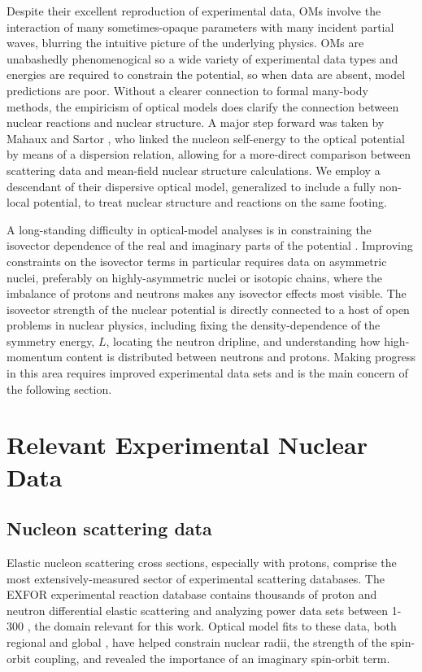 Despite their excellent reproduction of experimental data,
OMs involve the interaction of
many sometimes-opaque parameters with many incident
partial waves, blurring the intuitive picture of the underlying physics.
OMs are unabashedly phenomenogical so a wide variety of
experimental data types and energies are required to constrain the potential,
so when data are absent, model predictions are poor. Without a clearer connection to formal
many-body methods, the empiricism of optical models does clarify the connection between nuclear
reactions and nuclear structure. A major step forward was taken by Mahaux and Sartor
\cite{Mahaux1991}, who linked the nucleon self-energy to the \gls{optical potential} by means of a
dispersion relation, allowing for a more-direct comparison between scattering data and mean-field nuclear
structure calculations. We employ a descendant of their
dispersive optical model, generalized to include a
fully non-local potential, to treat nuclear structure and reactions on the same
footing.

A long-standing difficulty in optical-model analyses is in constraining the isovector dependence
of the real and imaginary parts of the potential \cite{Holt16, Anderson1990}. Improving constraints on the
isovector terms in particular requires data
on asymmetric nuclei, preferably on highly-asymmetric nuclei or isotopic chains,
where the imbalance of protons and neutrons makes any isovector effects most visible. The isovector
strength of the nuclear potential is directly connected to a host of open problems in nuclear physics,
including fixing the density-dependence of the symmetry energy, $L$, locating the
neutron dripline, and understanding how high-momentum content is distributed between neutrons and
protons. Making progress in this area requires improved experimental data sets
and is the main concern of the following section.

\section{Relevant Experimental Nuclear Data}

\subsection{Nucleon scattering data}
Elastic nucleon scattering cross sections, especially with protons, comprise the most extensively-measured
sector of experimental scattering databases. The EXFOR experimental reaction database
\cite{EXFORDatabase} contains thousands of proton and neutron
differential elastic scattering and analyzing
power data sets between 1-300 \mega\electronvolt, the domain relevant for this work. Optical model fits
to these data, both regional and global \cite{CH89, KoningDelaroche}, have helped
constrain nuclear radii, the strength of the spin-orbit coupling,
and revealed the importance of an imaginary spin-orbit term.

